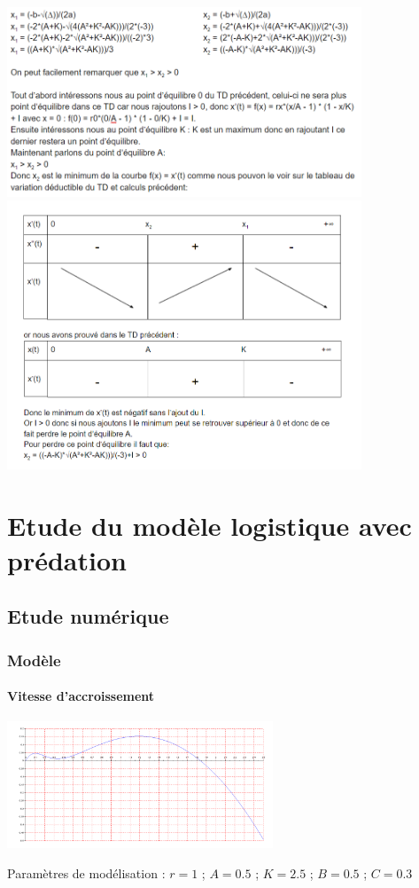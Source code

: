 \documentclass{article}
\begin{document}
\begin{center}
\includegraphics[width=400px]{1.png}
\includegraphics[width=400px]{2.png}
\end{center}

\newpage

\section{Etude du modèle logistique avec prédation}

\subsection{Etude numérique}

\subsubsection{Modèle}

\paragraph{Vitesse d'accroissement}
\begin{center}
\includegraphics[width=300px]{img/part2/Log.png}
\end{center}
Paramètres de modélisation : $r=1$ ; $A=0.5$ ; $K=2.5$ ; $B=0.5$ ; $C=0.3$
\end{document}
